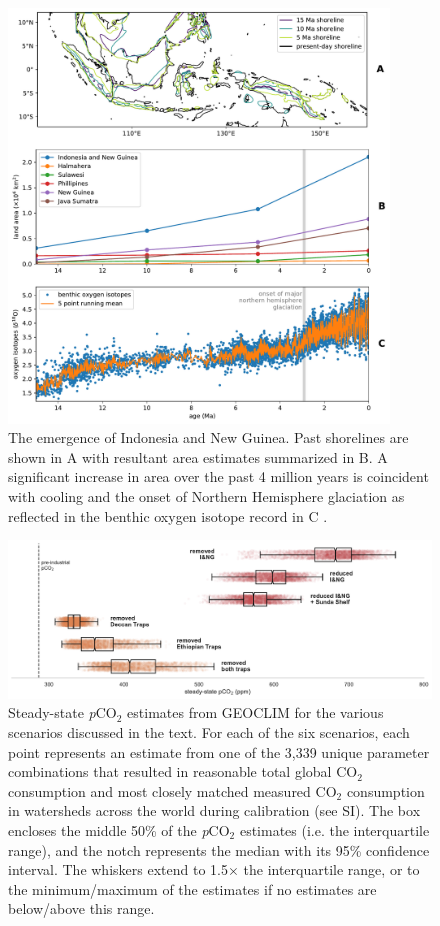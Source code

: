 \documentclass[11pt,letterpaper]{article}
\newcommand{\pCOtwo}{\textit{p}CO$_{2}$\xspace}
\newcommand{\COtwo}{CO$_{2}$\xspace}
\begin{document}
\begin{figure}[h!]
    \centering
    \includegraphics[width=0.9\textwidth]{Manuscript/Figures/shoreline_growth.pdf}
    \caption{The emergence of Indonesia and New Guinea. Past shorelines are shown in A with resultant area estimates summarized in B. A significant increase in area over the past 4 million years is coincident with cooling and the onset of Northern Hemisphere glaciation as reflected in the benthic oxygen isotope record in C \citep{Zachos2008a}.}
    \label{fig:shoreline_growth}
\end{figure}

\begin{figure}[h!]
    \centering
    \includegraphics[width=1\textwidth]{Manuscript/Figures/scenario_pCO2.pdf}
    \caption{Steady-state \pCOtwo estimates from GEOCLIM for the various scenarios discussed in the text. For each of the six scenarios, each point represents an estimate from one of the 3,339 unique parameter combinations that resulted in reasonable total global \COtwo consumption and most closely matched measured \COtwo consumption in watersheds across the world during calibration (see SI). The box encloses the middle 50\% of the \pCOtwo estimates (i.e. the interquartile range), and the notch represents the median with its 95\% confidence interval. The whiskers extend to 1.5$\times$ the interquartile range, or to the minimum/maximum of the estimates if no estimates are below/above this range.}
    \label{fig:scenario_pCO2}
\end{figure}

\clearpage
\newpage
\footnotesize

\singlespacing



\end{document}
